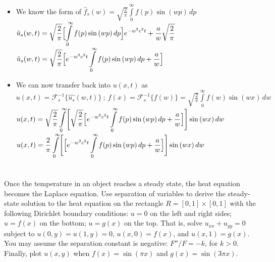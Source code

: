 \documentclass[10pt]{article}
\begin{document}
\begin{itemize}
\newpage

    \item We know the form of $ \displaystyle \hat{f}_{s}(w) = \sqrt{\frac{2}{\pi}} \int \limits_{0}^{\infty} f(p)\sin{(wp)} \, dp $ \\
    \subitem $ \displaystyle \hat{u}_{s}(w,t) = \sqrt{\frac{2}{\pi}} \Bigl[ \int \limits_{0}^{\infty} f(p)\sin{(wp)} \, dp \Bigr]e^{-w^2c^2t} + \frac{a}{w}\sqrt{\frac{2}{\pi}} $ \\
    \subitem $ \displaystyle \hat{u}_{s}(w,t) = \sqrt{\frac{2}{\pi}} \Bigl[ e^{-w^2c^2t} \int \limits_{0}^{\infty} f(p)\sin{(wp)} \, dp + \frac{a}{w} \Bigr] $ \\
    \item We can now transfer back into $ \displaystyle u(x,t) $ as $ \displaystyle u(x,t) = \mathcal{F}_{s}^{-1}\{ \hat{u_{s}}(w,t) \} \ ; \ f(x) = \mathcal{F}_{s}^{-1}\{f(w)\} = \sqrt{\frac{2}{\pi}} \int \limits_{0}^{\infty} f(w)\sin{(wx)} \, dw $ \\
    \subitem $ \displaystyle u(x,t) = \sqrt{\frac{2}{\pi}} \int \limits_{0}^{\infty} \Biggl[ \sqrt{\frac{2}{\pi}} \Bigl[ e^{-w^2c^2t} \int \limits_{0}^{\infty} f(p)\sin{(wp)} \, dp + \frac{a}{w} \Bigr] \Biggr]\sin{(wx)} \, dw $ \\
    \subitem $ \displaystyle u(x,t) = \frac{2}{\pi} \int \limits_{0}^{\infty} \Biggl[ \Bigl[ e^{-w^2c^2t} \int \limits_{0}^{\infty} f(p)\sin{(wp)} \, dp + \frac{a}{w} \Bigr] \Biggr]\sin{(wx)} \, dw $ \\
\end{itemize}

\newpage


\section{\underline{}}
\label{sec: Problem 4}

\noindent
Once the temperature in an object reaches a steady state, 
the heat equation becomes the Laplace equation.  
Use separation of variables to derive the steady-state solution to the heat equation on the rectangle 
$ R = [0,1] \times [0,1] $ with the following Dirichlet boundary conditions: 
$ u = 0 $ on the left and right sides; 
$ u = f(x) $ on the bottom; 
$ u = g(x) $ on the top. 
That is, solve $ u_{xx} + u_{yy} = 0 $ subject to 
$ u(0,y) = u(1,y) = 0 $, $ u(x,0) = f(x) $, and $ u(x,1) = g(x) $. 
You may assume the separation constant is negative: $ F'' / F = -k $, for $ k > 0 $. 
Finally, plot $ u(x,y) $ when $ f(x) = \sin{(\pi x)} $ and $ g(x) = \sin{(3\pi x)} $. \\
\vspace{2.5mm}
\end{document}
